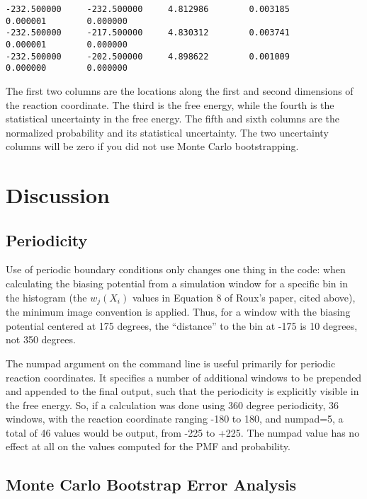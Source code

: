 \documentclass[12pt]{article}
\begin{document}
\begin{footnotesize}
\begin{verbatim}
-232.500000     -232.500000     4.812986        0.003185        0.000001        0.000000
-232.500000     -217.500000     4.830312        0.003741        0.000001        0.000000
-232.500000     -202.500000     4.898622        0.001009        0.000000        0.000000
\end{verbatim}
\end{footnotesize}


The first two columns are the locations along the first and second
dimensions of the reaction coordinate.  The third is the free energy, while
the fourth is the statistical uncertainty in the free energy.  The fifth
and sixth columns are the normalized probability and its statistical
uncertainty.  The two uncertainty columns will be zero if you did not use
Monte Carlo bootstrapping.

\section{Discussion}

\subsection{Periodicity}

Use of periodic boundary conditions only changes one thing in the
code: when calculating the biasing potential from a simulation window for a
specific bin in the histogram (the $w_j(X_i)$ values in Equation 8 of Roux's
paper, cited above), the minimum image convention is applied.  Thus, for a
window with the biasing potential centered at 175 degrees, the ``distance''
to the bin at -175 is 10 degrees, not 350 degrees.

The numpad argument on the command line is useful primarily for periodic
reaction coordinates.  It specifies a number of additional windows to be
prepended and appended to the final output, such that the periodicity is
explicitly visible in the free energy.  So, if a calculation was done using
360 degree periodicity, 36 windows, with the reaction coordinate ranging
-180 to 180, and numpad=5, a total of 46 values would be output, from -225
to +225.  The numpad value has no effect at all on the values computed for
the PMF and probability.

\subsection{Monte Carlo Bootstrap Error Analysis}
\label{ss:bootstrap}
\end{document}
